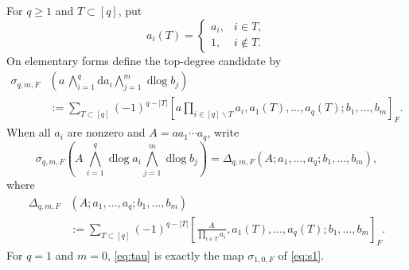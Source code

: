 \documentclass[a4paper,12pt,reqno]{amsart}
\numberwithin{equation}{section}
\theoremstyle{definition}
\DeclareMathOperator{\dlog}{dlog}
\renewcommand{\d}{\mathrm{d}}
\begin{document}
For $q\geq1$ and $T\subset[q]$, put
\begin{equation}\label{eq:cdef}
 a_i(T)=
 \begin{cases}
 a_i,&i\in T,\\
 1,&i\notin T.
 \end{cases}
\end{equation}
On elementary forms define the top-degree candidate by
\begin{align}\label{eq:tau}
 \sigma_{q,m,F}
 &\left(a\,\bigwedge_{i=1}^q\d a_i\bigwedge_{j=1}^m\dlog b_j\right)\\
 &:=
 \sum_{T\subset[q]}(-1)^{q-|T|}
 \left[
 a\prod_{i\in[q]\smallsetminus T}a_i,
 a_1(T),\ldots,a_q(T);b_1,\dots,b_m
 \right]_F.
\end{align}
When all $a_i$ are nonzero and $A=a a_1\cdots a_q$, write
\begin{equation}\label{eq:deltaq}
 \sigma_{q,m,F}
 \left(A\,\bigwedge_{i=1}^q\dlog a_i\bigwedge_{j=1}^m\dlog b_j\right)
 =\Delta_{q,m,F}(A;a_1,\ldots,a_q;b_1,\dots,b_m),
\end{equation}
where
\begin{align}\label{eq:delq}
 \Delta_{q,m,F}&(A;a_1,\ldots,a_q;b_1,\dots,b_m)\\
 &:=
 \sum_{T\subset[q]}(-1)^{q-|T|}
 \left[
 \frac{A}{\prod_{i\in T}a_i},
 a_1(T),\ldots,a_q(T);b_1,\dots,b_m
 \right]_F.
\end{align}
For $q=1$ and $m=0$, \eqref{eq:tau} is exactly the map $\sigma_{1,0,F}$ of
\eqref{eq:s1}.
\end{document}
